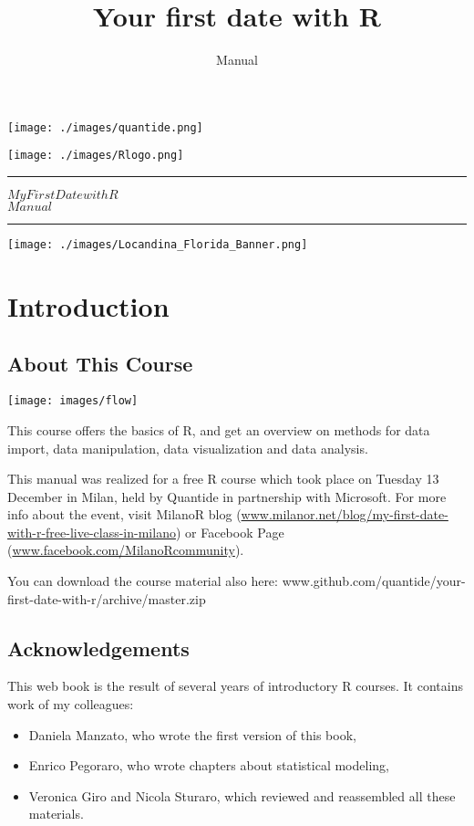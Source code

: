 \documentclass[]{book}
\title{Your first date with R}
\subtitle{Manual}
\author{}
\date{}
\providecommand{\tightlist}{%
  \setlength{\itemsep}{0pt}\setlength{\parskip}{0pt}}
\def\tightlist{}
\def\maketitle{%
  \null
  \thispagestyle{empty}%
  \hspace{-2cm}
   \begin{flushleft}\texttt{[image: ./images/quantide.png]}\end{flushleft}
  \vspace{-2cm}
  \begin{flushright}\texttt{[image: ./images/Rlogo.png]}\end{flushright}
  \vskip 3cm
  \hrule height 2pt
  \begin{center} \par \huge \strut \textbf{$My  First  Date  with  R$}\\ $Manual$ \par  \end{center}
  \vspace{0.5cm}
  \hrule height 2pt
  \vspace{0.5cm}
  \vspace{2cm}
  \texttt{[image: ./images/Locandina\_Florida\_Banner.png]}
  \clearpage
}
\begin{document}
\maketitle

{
\setcounter{tocdepth}{1}
\tableofcontents
}
\chapter{Introduction}\label{introduction}

\section{About This Course}\label{about-this-course}

\texttt{[image: images/flow]}

This course offers the basics of R, and get an overview on methods for
data import, data manipulation, data visualization and data analysis.

This manual was realized for a free R course which took place on Tuesday
13 December in Milan, held by Quantide in partnership with Microsoft.
For more info about the event, visit MilanoR blog
(\href{http://www.milanor.net/blog/my-first-date-with-r-free-live-class-in-milano/}{www.milanor.net/blog/my-first-date-with-r-free-live-class-in-milano})
or Facebook Page
(\href{https://www.facebook.com/MilanoRcommunity/?ref=aymt_homepage_panel}{www.facebook.com/MilanoRcommunity}).

You can download the course material also here:
www.github.com/quantide/your-first-date-with-r/archive/master.zip

\section{Acknowledgements}\label{acknowledgements}

This web book is the result of several years of introductory R courses.
It contains work of my colleagues:

\begin{itemize}
\tightlist
\item
  Daniela Manzato, who wrote the first version of this book,
\item
  Enrico Pegoraro, who wrote chapters about statistical modeling,
\item
  Veronica Giro and Nicola Sturaro, which reviewed and reassembled all
  these materials.
\end{itemize}
\end{document}
